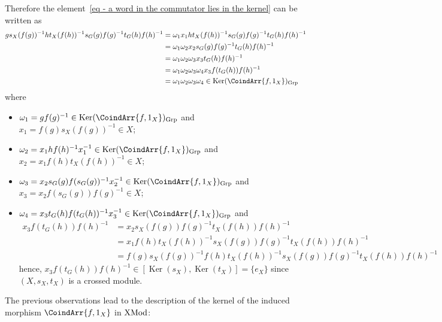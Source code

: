 \documentclass[a4paper, british, reqno]{amsart}
\DeclareMathOperator{\Ker}{Ker} %
\renewcommand*{\and}{,}
\renewcommand*{\and}{,}
\newcommand*{\CatName}[1]{\textnormal{#1}}
\newcommand*{\Grp}{\CatName{Grp}}
\newcommand*{\XMod}{\CatName{XMod}}
\theoremstyle{definition}
\theoremstyle{remark}
\begin{document}
Therefore the element~\eqref{eq - a word in the commutator lies in the kernel} can be written as
\[
	\begin{split}
		gs_X(f(g))^{-1}ht_X(f(h))^{-1}s_G(g)f(g)^{-1}t_G(h)f(h)^{-1} & = \omega_1 x_1ht_X(f(h))^{-1}s_G(g)f(g)^{-1}t_G(h)f(h)^{-1}              \\
		                                                             & =\omega_1 \omega_2 x_2 s_G(g)f(g)^{-1}t_G(h)f(h)^{-1}                    \\
		                                                             & =\omega_1 \omega_2 \omega_3 x_3 t_G(h)f(h)^{-1}                          \\
		                                                             & =\omega_1 \omega_2\omega_3 \omega_4 x_3 f(t_G(h))f(h)^{-1}               \\
		                                                             & = \omega_1\omega_2 \omega_3 \omega_4 \in \Ker(\CoindArr{f\and 1_X})_\Grp
	\end{split}
\]
where
\begin{itemize}
	\item \(\omega_1=gf(g)^{-1}\in \Ker(\CoindArr{f\and 1_X})_\Grp\) and \(x_1=f(g)s_X(f(g))^{-1}\in X\);
	\item \(\omega_2=x_1hf(h)^{-1}x_1^{-1} \in \Ker(\CoindArr{f\and 1_X})_\Grp\) and \(x_2=x_1f(h)t_X(f(h))^{-1}\in X\);
	\item \(\omega_3=x_2s_G(g)f(s_G(g))^{-1}x_2^{-1}\in \Ker(\CoindArr{f\and 1_X})_\Grp\) and \(x_3=x_2f(s_G(g))f(g)^{-1}\in X\);
	\item \(\omega_4=x_3t_G(h)f(t_G(h))^{-1}x_3^{-1}\in \Ker(\CoindArr{f\and 1_X})_\Grp\) and
	      \[
		      \begin{split}
			      x_3 f(t_G(h))f(h)^{-1} & = x_2 s_X(f(g))f(g)^{-1}t_X(f(h))f(h)^{-1}                                 \\
			                             & = x_1f(h)t_X(f(h))^{-1}s_X(f(g))f(g)^{-1}t_X(f(h))f(h)^{-1}                \\
			                             & = f(g)s_X(f(g))^{-1}f(h)t_X(f(h))^{-1}s_X(f(g))f(g)^{-1}t_X(f(h))f(h)^{-1}
		      \end{split}
	      \]
	      hence, \(x_3 f(t_G(h))f(h)^{-1}\in [\Ker(s_X),\Ker(t_X)]=\{ e_X\}\) since \((X,s_X,t_X)\) is a crossed module.
\end{itemize}

The previous observations lead to the description of the kernel of the induced morphism \(\CoindArr{f\and 1_X}\) in \(\XMod\):
\end{document}
